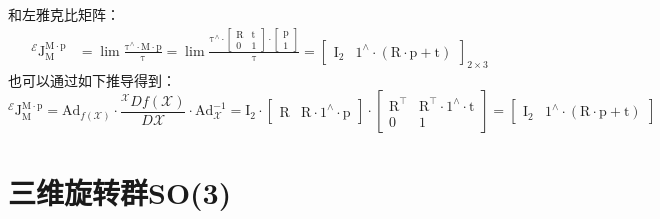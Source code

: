 \documentclass[12pt, onecolumn]{article}
\newcommand\normf{\fangsong}
\newcommand\liehat[1]{#1^{\land}}
\newcommand\bsm[1]{\boldsymbol{\mathrm{#1}}}
\begin{document}
	和左雅克比矩阵：
	\begin{equation}
	\begin{aligned}
	^\mathcal{E}\bsm{J}_{\bsm{M}}^{\bsm{M}\cdot\bsm{p}}&=
	\lim\frac{\liehat{\bsm{\tau}}  \cdot\bsm{M}\cdot\bsm{p}}{\bsm{\tau}}
		=\lim\frac{\liehat{\bsm{\tau}}  \cdot	\begin{bmatrix}
		\bsm{R}&\bsm{t}\\\bsm{0}&1
		\end{bmatrix}\cdot\begin{bmatrix}
			\bsm{p}\\1
			\end{bmatrix}}{\bsm{\tau}}
		=\begin{bmatrix}
		\bsm{I}_2&\liehat{1}\cdot\left( \bsm{R}\cdot\bsm{p}+\bsm{t}\right) 
		\end{bmatrix}_{2\times 3}
	\end{aligned}
	\end{equation}
	也可以通过如下推导得到：
	\begin{equation}
	^\mathcal{E}\bsm{J}_{\bsm{M}}^{\bsm{M}\cdot\bsm{p}}=
	\bsm{Ad}_{f(\mathcal{X})}\cdot\frac{{^\mathcal{X}Df(\mathcal{X})}}{D\mathcal{X}}
		\cdot\bsm{Ad}_{\mathcal{X}}^{-1}
		=\bsm{I}_2\cdot
		\begin{bmatrix}
			\bsm{R}&\bsm{R}\cdot\liehat{1}\cdot\bsm{p}
			\end{bmatrix}
		 \cdot \begin{bmatrix}
		 			\bsm{R}^\top&\bsm{R}^\top\cdot\liehat{1}\cdot\bsm{t}\\
		 			\bsm{0}&1
		 			\end{bmatrix}=
		 		\begin{bmatrix}
		 				\bsm{I}_2&\liehat{1}\cdot\left( \bsm{R}\cdot\bsm{p}+\bsm{t}\right) 
		 				\end{bmatrix}
	\end{equation}
	
	\section{\normf 三维旋转群SO(3)}
	
	
	
	
	\newpage
	
	
		
	\newpage
\end{document}
